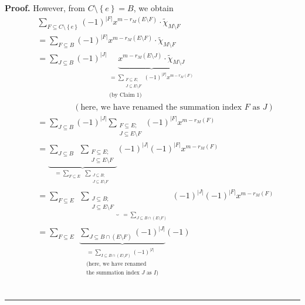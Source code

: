 \documentclass[numbers=enddot,12pt,final,onecolumn,notitlepage]{scrartcl}%
\theoremstyle{definition}
\newenvironment{proof}[1][Proof]{\noindent\textbf{#1.} }{\ \rule{0.5em}{0.5em}}
\newenvironment{verlong}{}{}
\let\sumnonlimits\sum
\renewcommand{\sum}{\sumnonlimits\limits}
\begin{document}
\begin{verlong}
\begin{proof}
However, from $C\setminus\left\{  e\right\}  =B$, we obtain%
\begin{align*}
&  \sum_{F\subseteq C\setminus\left\{  e\right\}  }\left(  -1\right)
^{\left\vert F\right\vert }x^{m-r_{M}\left(  E\setminus F\right)  }%
\cdot\widetilde{\chi}_{M\setminus F}\\
&  =\sum_{F\subseteq B}\left(  -1\right)  ^{\left\vert F\right\vert
}x^{m-r_{M}\left(  E\setminus F\right)  }\cdot\widetilde{\chi}_{M\setminus
F}\\
&  =\sum_{J\subseteq B}\left(  -1\right)  ^{\left\vert J\right\vert
}\underbrace{x^{m-r_{M}\left(  E\setminus J\right)  }\cdot\widetilde{\chi
}_{M\setminus J}}_{\substack{=\sum_{\substack{F\subseteq E;\\J\subseteq
E\setminus F}}\left(  -1\right)  ^{\left\vert F\right\vert }x^{m-r_{M}\left(
F\right)  }\\\text{(by Claim 1)}}}\\
&  \ \ \ \ \ \ \ \ \ \ \ \ \ \ \ \ \ \ \ \ \left(  \text{here, we have renamed
the summation index }F\text{ as }J\right) \\
&  =\sum_{J\subseteq B}\left(  -1\right)  ^{\left\vert J\right\vert }%
\sum_{\substack{F\subseteq E;\\J\subseteq E\setminus F}}\left(  -1\right)
^{\left\vert F\right\vert }x^{m-r_{M}\left(  F\right)  }\\
&  =\underbrace{\sum_{J\subseteq B}\ \ \sum_{\substack{F\subseteq
E;\\J\subseteq E\setminus F}}}_{=\sum_{F\subseteq E}\ \ \sum
_{\substack{J\subseteq B;\\J\subseteq E\setminus F}}}\left(  -1\right)
^{\left\vert J\right\vert }\left(  -1\right)  ^{\left\vert F\right\vert
}x^{m-r_{M}\left(  F\right)  }\\
&  =\sum_{F\subseteq E}\ \ \underbrace{\sum_{\substack{J\subseteq
B;\\J\subseteq E\setminus F}}}_{\substack{=\sum_{J\subseteq B\cap\left(
E\setminus F\right)  }}}\left(  -1\right)  ^{\left\vert J\right\vert }\left(
-1\right)  ^{\left\vert F\right\vert }x^{m-r_{M}\left(  F\right)  }\\
&  =\sum_{F\subseteq E}\ \ \underbrace{\sum_{J\subseteq B\cap\left(
E\setminus F\right)  }\left(  -1\right)  ^{\left\vert J\right\vert }%
}_{\substack{=\sum_{I\subseteq B\cap\left(  E\setminus F\right)  }\left(
-1\right)  ^{\left\vert I\right\vert }\\\text{(here, we have renamed}%
\\\text{the summation index }J\text{ as }I\text{)}}}\left(  -1\right)

\end{align*}
\end{proof}
\end{verlong}
\end{document}
